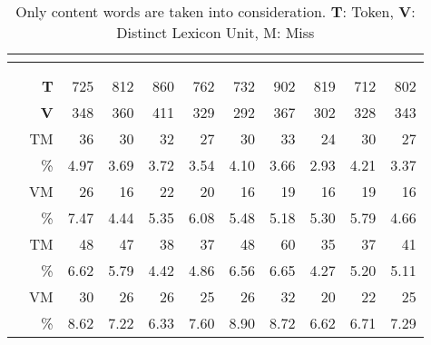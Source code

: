 \begin{table}
    \centering
    \begin{ThreePartTable}  
    \begin{tabularx}{\textwidth}{L *{10}{R}}
     \\
    \toprule
    &  &  \\
    \toprule
    &  &  &  & & & & & & & \\
    \toprule

     & \textbf{T} & 725 & 812 & 860 & 762 & 732 & 902 & 819 & 712 & 802 \\
    & \textbf{V} & 348 & 360 & 411 & 329 & 292 & 367 & 302 & 328 & 343 \\
    \midrule
     & TM & 36 & 30 & 32 & 27 & 30 & 33 & 24 & 30 & 27 \\
    & \% & 4.97 & 3.69 & 3.72 & 3.54 & 4.10 & 3.66 & 2.93 & 4.21 & 3.37 \\
     & VM & 26 & 16 & 22 & 20 & 16 & 19 & 16 & 19 & 16 \\
     & \% & 7.47 & 4.44 & 5.35 & 6.08 & 5.48 & 5.18 & 5.30 & 5.79 & 4.66 \\
    \midrule
     & TM & 48 & 47 & 38 & 37 & 48 & 60 & 35  & 37 & 41 \\
    & \% & 6.62 & 5.79 & 4.42 & 4.86 & 6.56 & 6.65 & 4.27 & 5.20 & 5.11 \\
     & VM & 30 & 26 & 26 & 25 & 26 & 32 & 20 & 22 & 25 \\
     & \% & 8.62 & 7.22 & 6.33 & 7.60 & 8.90 & 8.72 & 6.62 & 6.71 & 7.29 \\
    \bottomrule
    \end{tabularx}
    \end{ThreePartTable}
    \caption[The Little Prince Vocabulary Coverage in Semantic Spaces]{Only content words are taken into consideration. \textbf{T}: Token, \textbf{V}: Distinct Lexicon Unit, M: Miss\label{tab:lppcoverage}}
    \end{table}